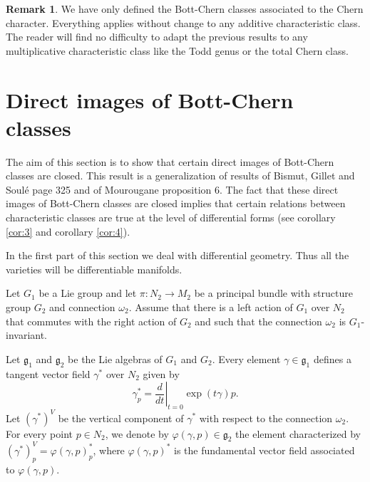 \documentclass[10pt,twoside]{article}
\numberwithin{equation}{section}
\theoremstyle{plain}
\theoremstyle{definition}
\newtheorem{remark}[equation]{Remark}
\begin{document}
\begin{remark} We have only defined the Bott-Chern
   classes associated to the Chern 
  character. Everything applies without change to any additive
  characteristic class. The reader will find no difficulty to adapt
  the previous results to any multiplicative characteristic class like
  the Todd genus or the total Chern class.
\end{remark}


\section{Direct images of Bott-Chern classes}
\label{sec:direct-images-bott}


The aim of this section is to show that certain direct images of
Bott-Chern classes are closed. This result is a generalization of
results of Bismut, Gillet and Soul\'e
\cite{BismutGilletSoule:MR1086887} page 325 and of Mourougane
\cite{Mourougane04:cbcc} proposition 6. The fact that these direct
images of Bott-Chern classes are closed implies that certain relations
between characteristic classes are true at the level of differential
forms (see corollary \ref{cor:3} and corollary \ref{cor:4}). 

In the first part of this section we deal with differential
geometry. Thus all the varieties will be differentiable manifolds.
  
Let $G_{1}$ be a Lie group and let $\pi
\colon N_{2}\longrightarrow M_{2}$ be a 
principal bundle with structure group $G_{2}$ and connection
$\omega_{2} $. Assume 
that there is a left action of $G_{1}$ over $N_{2}$ that commutes with the
right action of $G_{2}$ and such that the connection $\omega_{2} $ is
$G_{1}$-invariant. 

Let $\mathfrak{g}_{1}$ and $\mathfrak{g}_{2}$ be the Lie algebras of
$G_{1}$ and $G_{2}$. Every element $\gamma \in \mathfrak{g}_{1}$
defines a tangent vector field $\gamma ^{\ast}$ over $N_{2}$ given by
\begin{displaymath}
  \gamma ^{\ast}_{p}=\left. \frac{d}{dt}\right |_{t=0}\exp(t\gamma )p. 
\end{displaymath}
Let $(\gamma ^{\ast})^{V}$ be the vertical component of $\gamma
^{\ast}$ with respect to the connection $\omega_{2} $. For every point
$p\in N_{2}$, we denote by $\varphi(\gamma,p )\in \mathfrak{g}_{2}$
the element characterized by $(\gamma ^{\ast})_{p}^{V}=\varphi(\gamma
,p)_{p}^{\ast}$, where $\varphi(\gamma
,p)^{\ast}$ is the fundamental vector field associated to  
$\varphi(\gamma
,p)$. 
\end{document}

